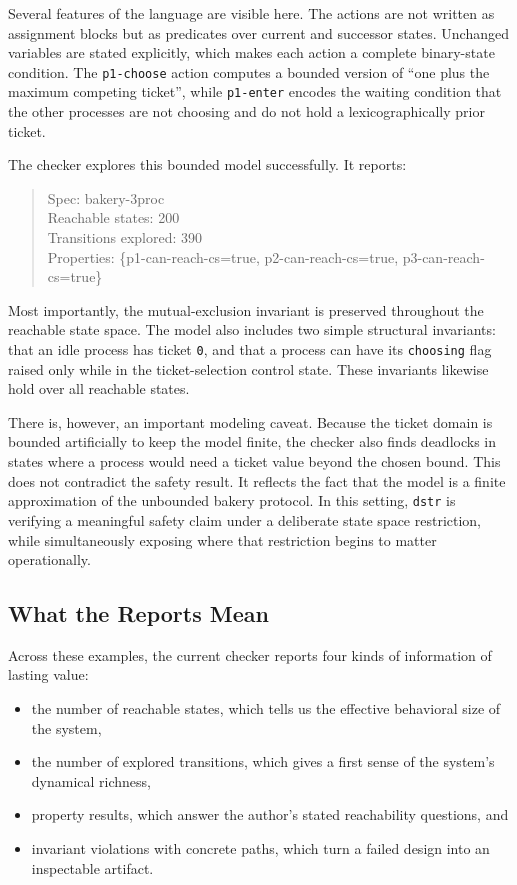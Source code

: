 \documentclass[11pt]{article}
\begin{document}
Several features of the language are visible here. The actions are not written
as assignment blocks but as predicates over current and successor states.
Unchanged variables are stated explicitly, which makes each action a complete
binary-state condition. The \texttt{p1-choose} action computes a bounded version
of ``one plus the maximum competing ticket'', while \texttt{p1-enter} encodes
the waiting condition that the other processes are not choosing and do not hold
a lexicographically prior ticket.

The checker explores this bounded model successfully. It reports:

\begin{quote}
Spec: bakery-3proc\\
Reachable states: 200\\
Transitions explored: 390\\
Properties: \{p1-can-reach-cs=true, p2-can-reach-cs=true,
p3-can-reach-cs=true\}
\end{quote}

Most importantly, the mutual-exclusion invariant is preserved throughout the
reachable state space. The model also includes two simple structural invariants:
that an idle process has ticket \texttt{0}, and that a process can have its
\texttt{choosing} flag raised only while in the ticket-selection control state.
These invariants likewise hold over all reachable states.

There is, however, an important modeling caveat. Because the ticket domain is
bounded artificially to keep the model finite, the checker also finds deadlocks
in states where a process would need a ticket value beyond the chosen bound.
This does not contradict the safety result. It reflects the fact that the model
is a finite approximation of the unbounded bakery protocol. In this setting,
\texttt{dstr} is verifying a meaningful safety claim under a deliberate state
space restriction, while simultaneously exposing where that restriction begins
to matter operationally.

\subsection{What the Reports Mean}

Across these examples, the current checker reports four kinds of information of
lasting value:

\begin{itemize}[leftmargin=*]
\item the number of reachable states, which tells us the effective behavioral
size of the system,
\item the number of explored transitions, which gives a first sense of the
system's dynamical richness,
\item property results, which answer the author's stated reachability
questions, and
\item invariant violations with concrete paths, which turn a failed design into
an inspectable artifact.
\end{itemize}
\end{document}
